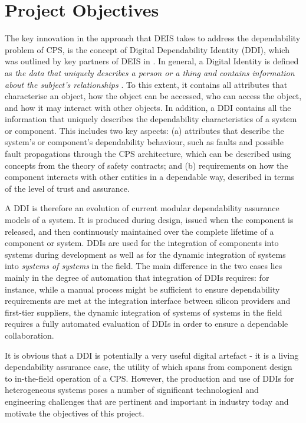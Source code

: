 \section{Project Objectives}
The key innovation in the approach that DEIS takes to address the dependability problem of CPS, is the concept of Digital Dependability Identity (DDI), which was outlined by key partners of DEIS in \cite{}. 
In general, a Digital Identity is defined as \emph{the data that uniquely describes a person or a thing and contains information about the subject's relationships} \cite{}. 
To this extent, it contains all attributes that characterise an object, how the object can be accessed, who can access the object, and how it may interact with other objects. In addition, a DDI contains all the information that uniquely describes the dependability characteristics of a system or component. This includes two key aspects: (a) attributes that describe the system’s or component’s dependability behaviour, such as faults and possible fault propagations through the CPS architecture, which can be described using concepts from the theory of safety contracts; and (b) requirements on how the component interacts with other entities in a dependable way, described in terms of the level of trust and assurance.

A DDI is therefore an evolution of current modular dependability assurance models of a system. It is produced during design, issued when the component is released, and then continuously maintained over the complete lifetime of a component or system. DDIs are used for the integration of components into systems during development as well as for the dynamic integration of systems into \emph{systems of systems} in the field. The main difference in the two cases lies mainly in the degree of automation that integration of DDIs requires: for instance, while a manual process might be sufficient to ensure dependability requirements are met at the integration interface between silicon providers and first-tier suppliers, the dynamic integration of systems of systems in the field requires a fully automated evaluation of DDIs in order to ensure a dependable collaboration.

It is obvious that a DDI is potentially a very useful digital artefact - it is a living dependability assurance case, the utility of which spans from component design to in-the-field operation of a CPS. However, the production and use of DDIs for heterogeneous systems poses a number of significant technological and engineering challenges that are pertinent and important in industry today and motivate the objectives of this project. 

